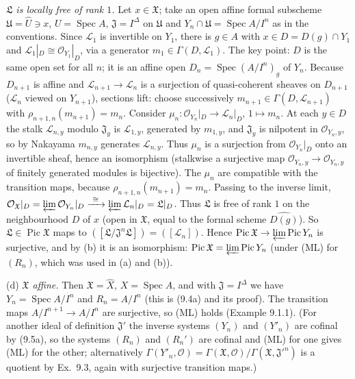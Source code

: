 \documentclass[11pt]{article}
\begin{document}
\emph{$\mathfrak L$ is locally free of rank $1$.} Let $x\in\mathfrak X$; take an open affine formal subscheme $\mathfrak U=\widehat U\ni x$, $U=\operatorname{Spec}A$, $\mathfrak J=I^\Delta$ on $\mathfrak U$ and $Y_n\cap\mathfrak U=\operatorname{Spec}A/I^n$ as in the conventions. Since $\mathcal L_1$ is invertible on $Y_1$, there is $g\in A$ with $x\in D=D(g)\cap Y_1$ and $\mathcal L_1|_D\cong\mathcal O_{Y_1}|_D$, via a generator $m_1\in\Gamma(D,\mathcal L_1)$. The key point: $D$ is the same open set for all $n$; it is an affine open $D_n=\operatorname{Spec}(A/I^n)_g$ of $Y_n$. Because $D_{n+1}$ is affine and $\mathcal L_{n+1}\to\mathcal L_n$ is a surjection of quasi-coherent sheaves on $D_{n+1}$ ($\mathcal L_n$ viewed on $Y_{n+1}$), sections lift: choose successively $m_{n+1}\in\Gamma(D,\mathcal L_{n+1})$ with $\rho_{n+1,n}(m_{n+1})=m_n$. Consider $\mu_n:\mathcal O_{Y_n}|_D\to\mathcal L_n|_D$, $1\mapsto m_n$. At each $y\in D$ the stalk $\mathcal L_{n,y}$ modulo $\mathfrak J_y$ is $\mathcal L_{1,y}$, generated by $m_{1,y}$, and $\mathfrak J_y$ is nilpotent in $\mathcal O_{Y_n,y}$, so by Nakayama $m_{n,y}$ generates $\mathcal L_{n,y}$. Thus $\mu_n$ is a surjection from $\mathcal O_{Y_n}|_D$ onto an invertible sheaf, hence an isomorphism (stalkwise a surjective map $\mathcal O_{Y_n,y}\to\mathcal O_{Y_n,y}$ of finitely generated modules is bijective). The $\mu_n$ are compatible with the transition maps, because $\rho_{n+1,n}(m_{n+1})=m_n$. Passing to the inverse limit, $\mathcal O_{\mathfrak X}|_D=\varprojlim\mathcal O_{Y_n}|_D\xrightarrow{\ \cong\ }\varprojlim\mathcal L_n|_D=\mathfrak L|_D$. Thus $\mathfrak L$ is free of rank $1$ on the neighbourhood $D$ of $x$ (open in $\mathfrak X$, equal to the formal scheme $\widehat{D(g)}$). So $\mathfrak L\in\operatorname{Pic}\mathfrak X$ maps to $([\mathfrak L/\mathfrak J^n\mathfrak L])=([\mathcal L_n])$. Hence $\operatorname{Pic}\mathfrak X\to\varprojlim\operatorname{Pic}Y_n$ is surjective, and by (b) it is an isomorphism: $\operatorname{Pic}\mathfrak X=\varprojlim\operatorname{Pic}Y_n$ (under (ML) for $(R_n)$, which was used in (a) and (b)).

(d) \emph{$\mathfrak X$ affine.} Then $\mathfrak X=\widehat X$, $X=\operatorname{Spec}A$, and with $\mathfrak J=I^\Delta$ we have $Y_n=\operatorname{Spec}A/I^n$ and $R_n=A/I^n$ (this is (9.4a) and its proof). The transition maps $A/I^{n+1}\to A/I^n$ are surjective, so (ML) holds (Example 9.1.1). (For another ideal of definition $\mathfrak J'$ the inverse systems $(Y_n)$ and $(Y'_n)$ are cofinal by (9.5a), so the systems $(R_n)$ and $(R_n')$ are cofinal and (ML) for one gives (ML) for the other; alternatively $\Gamma(Y'_n,\mathcal O)=\Gamma(\mathfrak X,\mathcal O)/\Gamma(\mathfrak X,\mathfrak J'^n)$ is a quotient by Ex.~9.3, again with surjective transition maps.)
\end{document}
